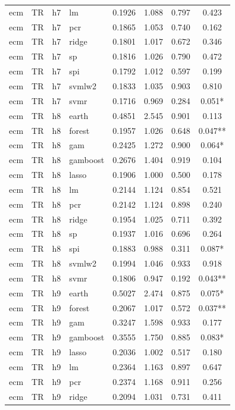 \begin{ThreePartTable}
\begin{longtable}[t]{llclcccc}
ecm & TR & h7 & lm & 0.1926 & 1.088 & 0.797 & 0.423\\
ecm & TR & h7 & pcr & 0.1865 & 1.053 & 0.740 & 0.162\\
ecm & TR & h7 & ridge & 0.1801 & 1.017 & 0.672 & 0.346\\
ecm & TR & h7 & sp & 0.1816 & 1.026 & 0.790 & 0.472\\
ecm & TR & h7 & spi & 0.1792 & 1.012 & 0.597 & 0.199\\
ecm & TR & h7 & svmlw2 & 0.1833 & 1.035 & 0.903 & 0.810\\
ecm & TR & h7 & svmr & 0.1716 & 0.969 & 0.284 & 0.051*\\
\addlinespace
ecm & TR & h8 & earth & 0.4851 & 2.545 & 0.901 & 0.113\\
ecm & TR & h8 & forest & 0.1957 & 1.026 & 0.648 & 0.047**\\
ecm & TR & h8 & gam & 0.2425 & 1.272 & 0.900 & 0.064*\\
ecm & TR & h8 & gamboost & 0.2676 & 1.404 & 0.919 & 0.104\\
ecm & TR & h8 & lasso & 0.1906 & 1.000 & 0.500 & 0.178\\
ecm & TR & h8 & lm & 0.2144 & 1.124 & 0.854 & 0.521\\
ecm & TR & h8 & pcr & 0.2142 & 1.124 & 0.898 & 0.240\\
ecm & TR & h8 & ridge & 0.1954 & 1.025 & 0.711 & 0.392\\
ecm & TR & h8 & sp & 0.1937 & 1.016 & 0.696 & 0.264\\
ecm & TR & h8 & spi & 0.1883 & 0.988 & 0.311 & 0.087*\\
ecm & TR & h8 & svmlw2 & 0.1994 & 1.046 & 0.933 & 0.918\\
ecm & TR & h8 & svmr & 0.1806 & 0.947 & 0.192 & 0.043**\\
\addlinespace
ecm & TR & h9 & earth & 0.5027 & 2.474 & 0.875 & 0.075*\\
ecm & TR & h9 & forest & 0.2067 & 1.017 & 0.572 & 0.037**\\
ecm & TR & h9 & gam & 0.3247 & 1.598 & 0.933 & 0.177\\
ecm & TR & h9 & gamboost & 0.3555 & 1.750 & 0.885 & 0.083*\\
ecm & TR & h9 & lasso & 0.2036 & 1.002 & 0.517 & 0.180\\
ecm & TR & h9 & lm & 0.2364 & 1.163 & 0.897 & 0.647\\
ecm & TR & h9 & pcr & 0.2374 & 1.168 & 0.911 & 0.256\\
ecm & TR & h9 & ridge & 0.2094 & 1.031 & 0.731 & 0.411\\

\end{longtable}
\end{ThreePartTable}
